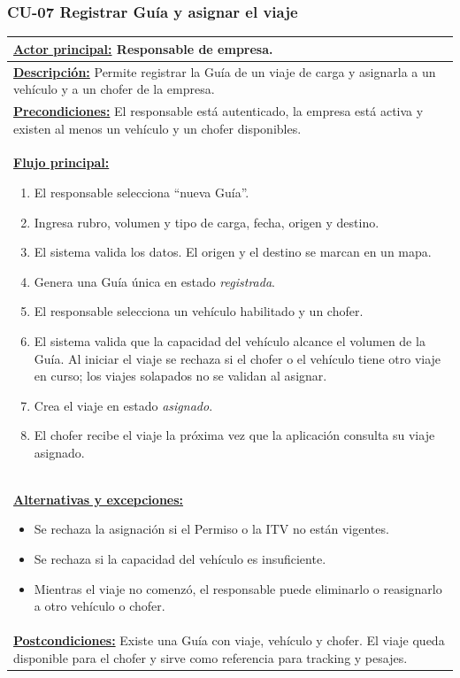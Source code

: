 \subsubsection{CU-07 Registrar Guía y asignar el viaje}\label{sec:cu-07}
\begin{table}[H]
\small
\setlength{\tabcolsep}{8pt}
\renewcommand{\arraystretch}{1.1}
\centering
\begin{tabular}{|p{15.8cm}|}
\hline
\textbf{\underline{Actor principal:}} Responsable de empresa. \\ \hline
\textbf{\underline{Descripción:}} Permite registrar la Guía de un viaje de carga y asignarla a un vehículo y a un chofer de la empresa. \\ \hline
\textbf{\underline{Precondiciones:}} El responsable está autenticado, la empresa está activa y existen al menos un vehículo y un chofer disponibles. \\ \hline
\textbf{\underline{Flujo principal:}}\par
\begin{enumerate}[leftmargin=*,topsep=2pt,itemsep=1pt,parsep=0pt,partopsep=0pt]
    \item El responsable selecciona “nueva Guía”.
    \item Ingresa rubro, volumen y tipo de carga, fecha, origen y destino.
    \item El sistema valida los datos. El origen y el destino se marcan en un mapa.
    \item Genera una Guía única en estado \emph{registrada}.
    \item El responsable selecciona un vehículo habilitado y un chofer.
    \item El sistema valida que la capacidad del vehículo alcance el volumen de la Guía. Al iniciar el viaje se rechaza si el chofer o el vehículo tiene otro viaje en curso; los viajes solapados no se validan al asignar.
    \item Crea el viaje en estado \emph{asignado}.
    \item El chofer recibe el viaje la próxima vez que la aplicación consulta su viaje asignado.
\end{enumerate} \\ \hline
\textbf{\underline{Alternativas y excepciones:}}\par
\begin{itemize}[leftmargin=*,topsep=2pt,itemsep=1pt,parsep=0pt,partopsep=0pt]
    \item Se rechaza la asignación si el Permiso o la ITV no están vigentes.
    \item Se rechaza si la capacidad del vehículo es insuficiente.
    \item Mientras el viaje no comenzó, el responsable puede eliminarlo o reasignarlo a otro vehículo o chofer.
\end{itemize} \\ \hline
\textbf{\underline{Postcondiciones:}} Existe una Guía con viaje, vehículo y chofer. El viaje queda disponible para el chofer y sirve como referencia para tracking y pesajes. \\ \hline
\end{tabular}
\end{table}

